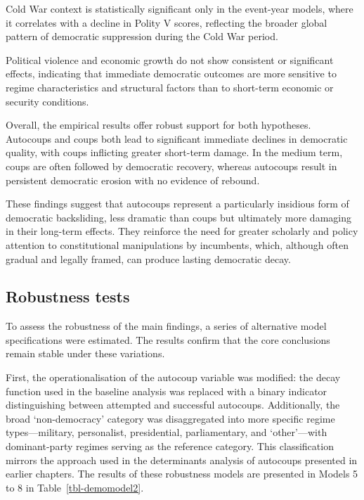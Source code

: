 \documentclass[
  12pt,
]{report}
\begin{document}
Cold War context is statistically significant only in the event-year
models, where it correlates with a decline in Polity V scores,
reflecting the broader global pattern of democratic suppression during
the Cold War period.

Political violence and economic growth do not show consistent or
significant effects, indicating that immediate democratic outcomes are
more sensitive to regime characteristics and structural factors than to
short-term economic or security conditions.

Overall, the empirical results offer robust support for both hypotheses.
Autocoups and coups both lead to significant immediate declines in
democratic quality, with coups inflicting greater short-term damage. In
the medium term, coups are often followed by democratic recovery,
whereas autocoups result in persistent democratic erosion with no
evidence of rebound.

These findings suggest that autocoups represent a particularly insidious
form of democratic backsliding, less dramatic than coups but ultimately
more damaging in their long-term effects. They reinforce the need for
greater scholarly and policy attention to constitutional manipulations
by incumbents, which, although often gradual and legally framed, can
produce lasting democratic decay.

\subsection*{Robustness tests}\label{robustness-tests}

To assess the robustness of the main findings, a series of alternative
model specifications were estimated. The results confirm that the core
conclusions remain stable under these variations.

First, the operationalisation of the autocoup variable was modified: the
decay function used in the baseline analysis was replaced with a binary
indicator distinguishing between attempted and successful autocoups.
Additionally, the broad `non-democracy' category was disaggregated into
more specific regime types---military, personalist, presidential,
parliamentary, and `other'---with dominant-party regimes serving as the
reference category. This classification mirrors the approach used in the
determinants analysis of autocoups presented in earlier chapters. The
results of these robustness models are presented in Models 5 to 8 in
Table~\ref{tbl-demomodel2}.
\end{document}
